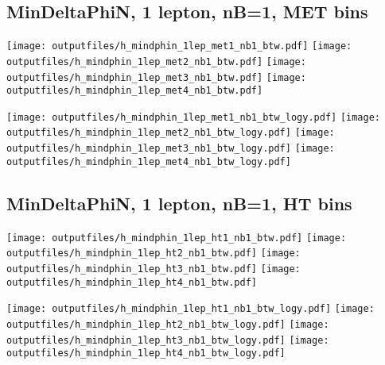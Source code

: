\documentclass[11pt]{article}
\begin{document}
    \subsection{ MinDeltaPhiN, 1 lepton, nB=1, MET bins }

    \noindent
     \texttt{[image: outputfiles/h\_mindphin\_1lep\_met1\_nb1\_btw.pdf]}
     \texttt{[image: outputfiles/h\_mindphin\_1lep\_met2\_nb1\_btw.pdf]}
     \texttt{[image: outputfiles/h\_mindphin\_1lep\_met3\_nb1\_btw.pdf]}
     \texttt{[image: outputfiles/h\_mindphin\_1lep\_met4\_nb1\_btw.pdf]}

    \noindent
     \texttt{[image: outputfiles/h\_mindphin\_1lep\_met1\_nb1\_btw\_logy.pdf]}
     \texttt{[image: outputfiles/h\_mindphin\_1lep\_met2\_nb1\_btw\_logy.pdf]}
     \texttt{[image: outputfiles/h\_mindphin\_1lep\_met3\_nb1\_btw\_logy.pdf]}
     \texttt{[image: outputfiles/h\_mindphin\_1lep\_met4\_nb1\_btw\_logy.pdf]}

    \clearpage






    \subsection{ MinDeltaPhiN, 1 lepton, nB=1, HT bins }

    \noindent
     \texttt{[image: outputfiles/h\_mindphin\_1lep\_ht1\_nb1\_btw.pdf]}
     \texttt{[image: outputfiles/h\_mindphin\_1lep\_ht2\_nb1\_btw.pdf]}
     \texttt{[image: outputfiles/h\_mindphin\_1lep\_ht3\_nb1\_btw.pdf]}
     \texttt{[image: outputfiles/h\_mindphin\_1lep\_ht4\_nb1\_btw.pdf]}

    \noindent
     \texttt{[image: outputfiles/h\_mindphin\_1lep\_ht1\_nb1\_btw\_logy.pdf]}
     \texttt{[image: outputfiles/h\_mindphin\_1lep\_ht2\_nb1\_btw\_logy.pdf]}
     \texttt{[image: outputfiles/h\_mindphin\_1lep\_ht3\_nb1\_btw\_logy.pdf]}
     \texttt{[image: outputfiles/h\_mindphin\_1lep\_ht4\_nb1\_btw\_logy.pdf]}

    \clearpage
\end{document}
